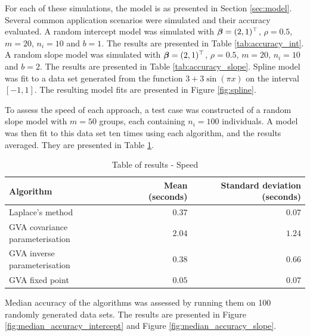 For each of these simulations, the model is as presented in Section \ref{sec:model}. Several common
application scenarios were simulated and their accuracy evaluated. A random intercept model was simulated with
${\boldsymbol \beta} = (2, 1)^\top$, $\rho = 0.5$, $m = 20$, $n_i = 10$ and $b = 1$. The results are presented in Table
\ref{tab:accuracy_int}. A random slope model was simulated with ${\boldsymbol \beta} = (2, 1)^\top$, $\rho = 0.5$, $m =
20$, $n_i = 10$ and $b = 2$. The results are presented in Table \ref{tab:accuracy_slope}. Spline model was fit
to a data set generated from the function $3 + 3 \sin{(\pi x)}$ on the interval $[-1, 1]$. The resulting model
fits are presented in Figure \ref{fig:spline}.
		
To assess the speed of each approach, a test case was constructed of a random slope model with $m=50$
groups, each containing $n_i = 100$ individuals. A model was then fit to this data set ten times using
each algorithm, and the results averaged. They are presented in Table \ref{tab:application_slope_speed}.

\begin{table}
	\begin{tabular}{|l|rr|}
		\hline
		Algorithm & Mean (seconds) & Standard deviation (seconds) \\
		\hline
		Laplace's method & $0.37$ & $0.07$ \\
		GVA covariance parameterisation & $2.04$ & $1.24$ \\
		GVA inverse parameterisation & $0.38$ & $0.66$ \\
		GVA fixed point & $0.05$ & $0.07$ \\
		\hline
	\end{tabular}
	\caption{Table of results - Speed}
	\label{tab:application_slope_speed}
\end{table}

		
Median accuracy of the algorithms was assessed by running them on 100 randomly generated data sets. The	results are presented in Figure \ref{fig:median_accuracy_intercept} and Figure
\ref{fig:median_accuracy_slope}.
		
